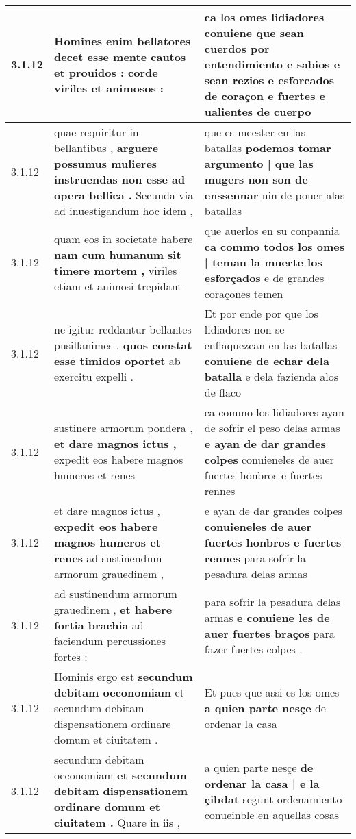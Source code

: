 \begin{tabular}{|p{1cm}|p{6.5cm}|p{6.5cm}|}
3.1.12 & Homines enim bellatores decet \textbf{ esse mente cautos et prouidos : } corde viriles et animosos : & ca los omes lidiadores conuiene que sean cuerdos \textbf{ por entendimiento e sabios } e sean rezios e esforcados de coraçon e fuertes e ualientes de cuerpo \\\hline
3.1.12 & quae requiritur in bellantibus , \textbf{ arguere possumus mulieres instruendas non esse ad opera bellica . } Secunda via ad inuestigandum hoc idem , & que es meester en las batallas \textbf{ podemos tomar argumento | que las mugers non son de enssennar } nin de pouer alas batallas \\\hline
3.1.12 & quam eos in societate habere \textbf{ nam cum humanum sit timere mortem , } viriles etiam et animosi trepidant & que auerlos en su conpannia \textbf{ ca commo todos los omes | teman la muerte los esforçados } e de grandes coraçones temen \\\hline
3.1.12 & ne igitur reddantur bellantes pusillanimes , \textbf{ quos constat esse timidos oportet } ab exercitu expelli . & Et por ende por que los lidiadores non se enflaquezcan en las batallas \textbf{ conuiene de echar dela batalla } e dela fazienda alos de flaco \\\hline
3.1.12 & sustinere armorum pondera , \textbf{ et dare magnos ictus , } expedit eos habere magnos humeros et renes & ca commo los lidiadores ayan de sofrir el peso delas armas \textbf{ e ayan de dar grandes colpes } conuieneles de auer fuertes honbros e fuertes rennes \\\hline
3.1.12 & et dare magnos ictus , \textbf{ expedit eos habere magnos humeros et renes } ad sustinendum armorum grauedinem , & e ayan de dar grandes colpes \textbf{ conuieneles de auer fuertes honbros e fuertes rennes } para sofrir la pesadura delas armas \\\hline
3.1.12 & ad sustinendum armorum grauedinem , \textbf{ et habere fortia brachia } ad faciendum percussiones fortes : & para sofrir la pesadura delas armas \textbf{ e conuiene les de auer fuertes braços } para fazer fuertes colpes . \\\hline
3.1.12 & Hominis ergo est \textbf{ secundum debitam oeconomiam } et secundum debitam dispensationem ordinare domum et ciuitatem . & Et pues que assi es los omes \textbf{ a quien parte nesçe } de ordenar la casa \\\hline
3.1.12 & secundum debitam oeconomiam \textbf{ et secundum debitam dispensationem ordinare domum et ciuitatem . } Quare in iis , & a quien parte nesçe \textbf{ de ordenar la casa | e la çibdat } segunt ordenamiento conueinble en aquellas cosas \\\hline

\end{tabular}

